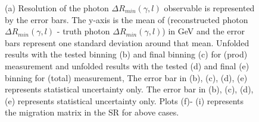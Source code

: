 \begin{figure}[ht]
    \hfill
    \hfill
    \hfill
    \hfill


    \caption{(a) Resolution of the photon $\Delta R_{min}(\gamma,l)$ observable is represented by the error bars. The y-axis
    is the mean of (reconstructed photon $\Delta R_{min}(\gamma,l)$ - truth photon $\Delta R_{min}(\gamma,l)$) in GeV and the error bars represent
    one standard deviation around that mean.
    Unfolded results with the tested binning (b) and final
    binning (c) for \tty(prod) measurement and unfolded results with the tested
    (d) and final (e) binning for \tty(total) measurement, The error bar in (b),
    (c), (d), (e) represents statistical uncertainty only.
    The error bar in (b), (c), (d), (e) represents statistical uncertainty only.
    Plots (f)- (i) represents the migration matrix in the SR for above cases.}
\end{figure}
\FloatBarrier


